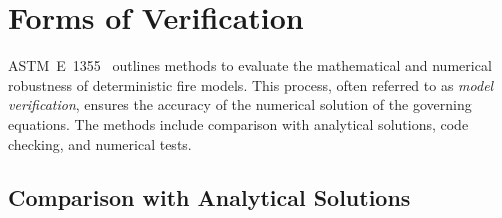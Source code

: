 \documentclass[11pt]{book}
\begin{document}
\chapter{Forms of Verification}

ASTM~E~1355~\cite{ASTM:E1355} outlines methods to evaluate the
mathematical and numerical robustness of deterministic fire
models. This process, often referred to as {\em model verification},
ensures the accuracy of the numerical solution of the governing
equations. The methods include comparison with analytical solutions,
code checking, and numerical tests.

\section{Comparison with Analytical Solutions}
\label{Analytical Tests}
\end{document}

